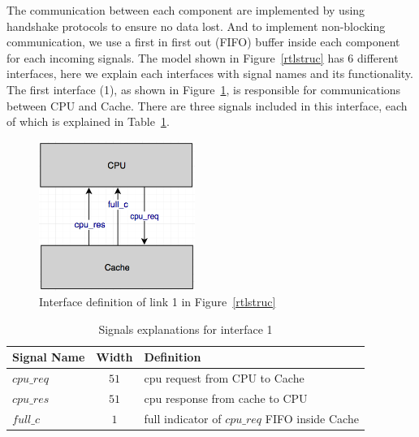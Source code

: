 \documentclass[12pt,frontmatter,copyright,thesis]{usfmanus}
\begin{document}
The communication between each component are implemented by using handshake protocols to ensure no
data lost. And to implement non-blocking communication, we use
a first in first out (FIFO) buffer inside each component for each incoming signals.
The model shown in Figure~\ref{rtlstruc} has 6 different interfaces, here we explain each interfaces
with signal names and its functionality.
The first interface (1), as shown in Figure~\ref{int1}, is responsible for communications between CPU and Cache.
There are three signals included in this interface, each of which is explained in Table~\ref{int1t}.
\begin{figure}[h]
\centering
    \includegraphics[width=2in]{int1.png}
    \caption{Interface definition of link 1 in Figure~\ref{rtlstruc}}
    \label{int1}
 \end{figure}

\begin{table}[h]
\caption{Signals explanations for interface 1}

\begin{tabular}{|l|c | p{12cm} |}
\hline
Signal Name & Width & Definition \\
\hline
\hline
$cpu\_req$ 		&$51$			& cpu request from CPU to Cache \\
\hline
$cpu\_res$ 		&$51$			& cpu response from cache to CPU \\
\hline
$full\_c$ 			&$1$				& full indicator of $cpu\_req$ FIFO inside Cache\\
\hline
\end{tabular}
\label{int1t}
\end{table}
\end{document}
